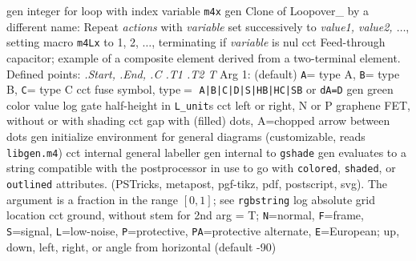  {gen}
  {integer for loop with index variable {\tt m4x} }
  {gen}
  {Clone of Loopover\_ by a different name:
   Repeat {\sl actions} with {\sl variable} set successively to
   {\sl value1, value2, $\ldots$}, setting macro {\tt m4Lx} to 1, 2,
   $\ldots$, terminating if {\sl variable} is nul}
  {cct}
  {Feed-through capacitor; example of a composite element derived from
   a two-terminal element.  Defined points: {\sl .Start, .End, .C .T1 .T2 T}
   Arg 1: (default) {\tt A}= type A, {\tt B}= type B, {\tt C}= type C 
   }
  {cct}
  {fuse symbol, type$=$
  {\tt  A|B|C|D|S|HB|HC|SB} or {\tt dA=D}}
%
  {gen}
  {green color value}
  {log}
  {gate half-height in {\tt L\_unit}s}
  {cct}
  {left or right, N or P graphene FET, without or with shading
    }
  {cct}
  {gap with (filled) dots, A=chopped arrow between dots}
  {gen}
  {initialize environment for general diagrams
    (customizable, reads {\tt libgen.m4})}
  {cct}
  {internal general labeller}
  {gen}
  {internal to {\tt gshade}}
  {gen}
  {evaluates to a string compatible with the postprocessor in use
   to go with {\tt colored}, {\tt shaded}, or {\tt outlined} attributes.
   (PSTricks, metapost, pgf-tikz, pdf, postscript, svg).
   The argument is a fraction in the range $[0,1]$; see {\tt rgbstring}}
  {log}
  {absolute grid location}
  {cct}
  { ground, without stem for 2nd arg = T;
    {\tt N}=normal, {\tt F}=frame, {\tt S}=signal, {\tt L}=low-noise,
    {\tt P}=protective,
    {\tt PA}=protective alternate,
    {\tt E}=European; up, down, left, right, or angle
    from horizontal (default -90) 
   }
